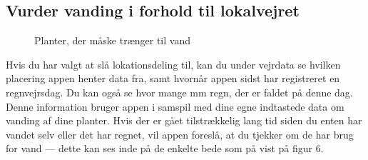 \subsection{Vurder vanding i forhold til lokalvejret}
\begin{minipage}{0.4\textwidth}
\begin{figure}[H]
    \centering
    \caption{Planter, der måske trænger til vand}
\end{figure}
\end{minipage} \hfill
\begin{minipage}{0.55\textwidth}
Hvis du har valgt at slå lokationsdeling til, kan du under vejrdata se hvilken placering appen henter data fra, samt hvornår appen sidst har registreret en regnvejrsdag. Du kan også se hvor mange mm regn, der er faldet på denne dag. Denne information bruger appen i samspil med dine egne indtastede data om vanding af dine planter. Hvis der er gået tilstrækkelig lang tid siden du enten har vandet selv eller det har regnet, vil appen foreslå, at du tjekker om de har brug for vand --- dette kan ses inde på de enkelte bede som på vist på figur 6.
\end{minipage} 
